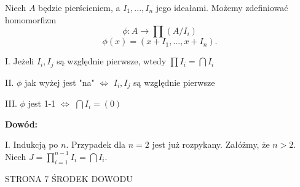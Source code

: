 Niech $A$ będzie pierścieniem, a $I_1,...,I_n$ jego ideałami. Możemy zdefiniować homomorfizm
$$\phi:A\to \prod(A/I_i)$$
$$\phi(x)=(x+I_1,...,x+I_n).$$


\indent I. Jeżeli $I_i,I_j$ są względnie pierwsze, wtedy $\prod I_i=\bigcap I_i$

\indent II. $\phi$ jak wyżej jest "na" $\iff$ $I_i, I_j$ są względnie pierwsze

\indent III. $\phi$ jest 1-1 $\iff$ $\bigcap I_i=(0)$

\textbf{Dowód:}

I. Indukcją po $n$. Przypadek dla $n=2$ jest już rozpykany. Załóżmy, że $n>2$. Niech $J=\prod_{i=1}^{n-1}I_i=\bigcap I_i$. 

STRONA 7 ŚRODEK DOWODU